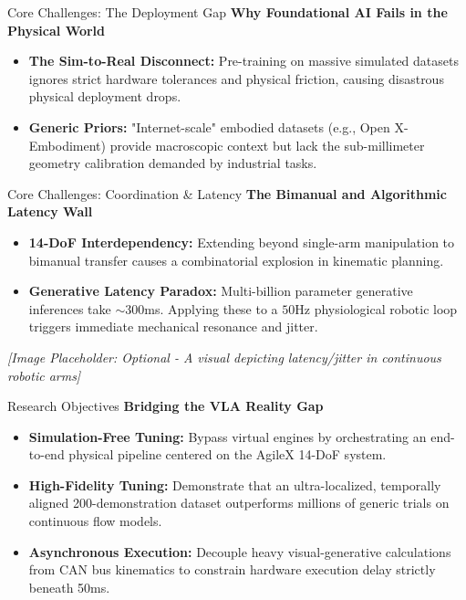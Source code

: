 \documentclass[aspectratio=169, t]{beamer}
\begin{document}
\begin{frame}{Core Challenges: The Deployment Gap}
    {\Large \textbf{Why Foundational AI Fails in the Physical World}}
    \vspace{0.5cm}
    \begin{itemize}
        \item \textbf{The Sim-to-Real Disconnect:} Pre-training on massive simulated datasets ignores strict hardware tolerances and physical friction, causing disastrous physical deployment drops.
        \item \textbf{Generic Priors:} "Internet-scale" embodied datasets (e.g., Open X-Embodiment) provide macroscopic context but lack the sub-millimeter geometry calibration demanded by industrial tasks.
    \end{itemize}
\end{frame}

\begin{frame}{Core Challenges: Coordination \& Latency}
    {\Large \textbf{The Bimanual and Algorithmic Latency Wall}}
    \vspace{0.5cm}
    \begin{itemize}
        \item \textbf{14-DoF Interdependency:} Extending beyond single-arm manipulation to bimanual transfer causes a combinatorial explosion in kinematic planning.
        \item \textbf{Generative Latency Paradox:} Multi-billion parameter generative inferences take $\sim$300ms. Applying these to a $50$Hz physiological robotic loop triggers immediate mechanical resonance and jitter.
    \end{itemize}
    \vspace{0.5cm}
    \textit{[Image Placeholder: Optional - A visual depicting latency/jitter in continuous robotic arms]}
\end{frame}

\begin{frame}{Research Objectives}
    {\Large \textbf{Bridging the VLA Reality Gap}}
    \vspace{0.5cm}
    \begin{itemize}
        \item \textbf{Simulation-Free Tuning:} Bypass virtual engines by orchestrating an end-to-end physical pipeline centered on the AgileX 14-DoF system.
        \item \textbf{High-Fidelity Tuning:} Demonstrate that an ultra-localized, temporally aligned 200-demonstration dataset outperforms millions of generic trials on continuous flow models.
        \item \textbf{Asynchronous Execution:} Decouple heavy visual-generative calculations from CAN bus kinematics to constrain hardware execution delay strictly beneath 50ms.
    \end{itemize}
\end{frame}
\end{document}
